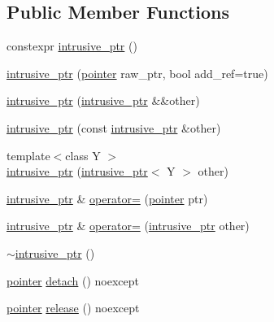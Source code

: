 \subsection*{Public Member Functions}
\begin{DoxyCompactItemize}
\item 
constexpr \hyperlink{classactor__zeta_1_1intrusive__ptr_aa0f955af381516d7cf298e79d83b708f}{intrusive\+\_\+ptr} ()
\item 
\hyperlink{classactor__zeta_1_1intrusive__ptr_aafe5cca9be938943d0708fa406cffc4a}{intrusive\+\_\+ptr} (\hyperlink{classactor__zeta_1_1intrusive__ptr_a149a1cdd3f154db67d7f53a371bfc4e4}{pointer} raw\+\_\+ptr, bool add\+\_\+ref=true)
\item 
\hyperlink{classactor__zeta_1_1intrusive__ptr_afd30f2ec4f89a30a5b78915187ff5f6b}{intrusive\+\_\+ptr} (\hyperlink{classactor__zeta_1_1intrusive__ptr}{intrusive\+\_\+ptr} \&\&other)
\item 
\hyperlink{classactor__zeta_1_1intrusive__ptr_a254d4ebf6a898bddceac94f5d2a3de4e}{intrusive\+\_\+ptr} (const \hyperlink{classactor__zeta_1_1intrusive__ptr}{intrusive\+\_\+ptr} \&other)
\item 
{\footnotesize template$<$class Y $>$ }\\\hyperlink{classactor__zeta_1_1intrusive__ptr_acc5aad05327df8f0a41ea40fed0bc41b}{intrusive\+\_\+ptr} (\hyperlink{classactor__zeta_1_1intrusive__ptr}{intrusive\+\_\+ptr}$<$ Y $>$ other)
\item 
\hyperlink{classactor__zeta_1_1intrusive__ptr}{intrusive\+\_\+ptr} \& \hyperlink{classactor__zeta_1_1intrusive__ptr_a65cc4fab359f873c03813e73c387146b}{operator=} (\hyperlink{classactor__zeta_1_1intrusive__ptr_a149a1cdd3f154db67d7f53a371bfc4e4}{pointer} ptr)
\item 
\hyperlink{classactor__zeta_1_1intrusive__ptr}{intrusive\+\_\+ptr} \& \hyperlink{classactor__zeta_1_1intrusive__ptr_a1e9cca8a5a571fbc303cdc914a29885b}{operator=} (\hyperlink{classactor__zeta_1_1intrusive__ptr}{intrusive\+\_\+ptr} other)
\item 
\hyperlink{classactor__zeta_1_1intrusive__ptr_abada9b4b6be97607546a39d9801a9266}{$\sim$intrusive\+\_\+ptr} ()
\item 
\hyperlink{classactor__zeta_1_1intrusive__ptr_a149a1cdd3f154db67d7f53a371bfc4e4}{pointer} \hyperlink{classactor__zeta_1_1intrusive__ptr_a96b81f2016853eb1c13352e7538dcb37}{detach} () noexcept
\item 
\hyperlink{classactor__zeta_1_1intrusive__ptr_a149a1cdd3f154db67d7f53a371bfc4e4}{pointer} \hyperlink{classactor__zeta_1_1intrusive__ptr_ad9747a7d8669483fc782fc5823b8f096}{release} () noexcept

\end{DoxyCompactItemize}
